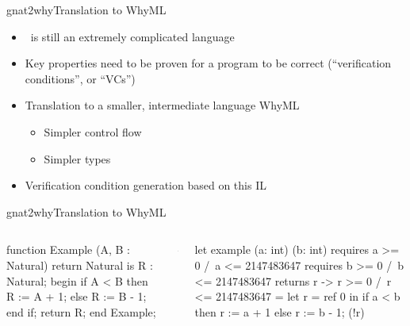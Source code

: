 \documentclass{beamer}
\begin{document}

\begin{frame}{gnat2why}{Translation to WhyML}
  \begin{itemize}
  \item \spark\ is still an extremely complicated language
  \item Key properties need to be proven for a program to be correct
    (``verification conditions'', or ``VCs'')
  \item Translation to a smaller, intermediate language WhyML
    \begin{itemize}
    \item Simpler control flow
    \item Simpler types
    \end{itemize}
  \item Verification condition generation based on this IL
  \end{itemize}
\end{frame}

\begin{frame}[fragile]{gnat2why}{Translation to WhyML}
\begin{columns}[c]
\begin{column}{3cm}
  \begin{pxcode}[language=SPARK,gobble=4]
    function Example
       (A, B : Natural)
        return Natural
    is
       R : Natural;
    begin
       if A < B then
          R := A + 1;
       else
          R := B - 1;
       end if;
       return R;
    end Example;
  \end{pxcode}
\end{column}
\pause
\begin{column}{0.3cm}
  $\rightarrow$
\end{column}
\begin{column}{7cm}
\begin{pxcode}[language=ML]
let example (a: int) (b: int)
    requires { a >= 0 /\ a <= 2147483647 }
    requires { b >= 0 /\ b <= 2147483647 }
    returns { r -> r >= 0 /\
                   r <= 2147483647 }
  = let r = ref 0 in
    if a < b then
       r := a + 1
    else
       r := b - 1;
    (!r)
\end{pxcode}
\end{column}
\end{columns}
\end{frame}
\end{document}
